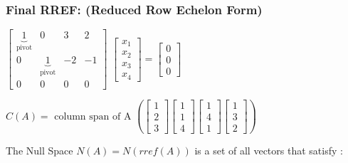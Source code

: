 \documentclass[11pt]{article}
\begin{document}
\subsubsection{\texorpdfstring{\textbf{Final RREF:} (Reduced Row Echelon
Form)}{Final RREF: (Reduced Row Echelon Form)}}\label{final-rref-reduced-row-echelon-form}

\(\begin{bmatrix} \underbrace{1}_{\text{pivot}} & 0 & 3 & 2 \\ 0 & \underbrace{1}_{\text{pivot}} & -2 & -1 \\ 0 & 0 & 0 & 0 \end{bmatrix}\)
\(\begin{bmatrix}
   x_1 \\
   x_2 \\
   x_3 \\
   x_4
\end{bmatrix} =
\begin{bmatrix}
   0 \\
   0 \\
   0
\end{bmatrix}\)

\(C(A) = \text{ column span of A }\left( \begin{bmatrix}
                       1 \\
                       2 \\
                       3
                    \end{bmatrix}
                    \begin{bmatrix}
                       1 \\
                       1 \\
                       4
                    \end{bmatrix}
                    \begin{bmatrix}
                       1 \\
                       4 \\
                       1
                    \end{bmatrix}
                    \begin{bmatrix}
                       1 \\
                       3 \\
                       2
                    \end{bmatrix}
                \right)\)

The Null Space \(N(A) = N( rref(A) )\) is a set of all vectors that
satisfy :
\end{document}
